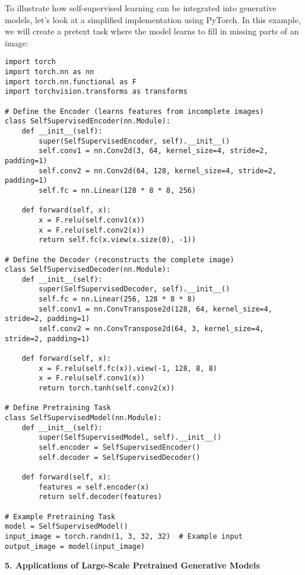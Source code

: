 To illustrate how self-supervised learning can be integrated into generative models, let's look at a simplified implementation using PyTorch. In this example, we will create a pretext task where the model learns to fill in missing parts of an image:

\begin{lstlisting}[style=python]
import torch
import torch.nn as nn
import torch.nn.functional as F
import torchvision.transforms as transforms

# Define the Encoder (learns features from incomplete images)
class SelfSupervisedEncoder(nn.Module):
    def __init__(self):
        super(SelfSupervisedEncoder, self).__init__()
        self.conv1 = nn.Conv2d(3, 64, kernel_size=4, stride=2, padding=1)
        self.conv2 = nn.Conv2d(64, 128, kernel_size=4, stride=2, padding=1)
        self.fc = nn.Linear(128 * 8 * 8, 256)
    
    def forward(self, x):
        x = F.relu(self.conv1(x))
        x = F.relu(self.conv2(x))
        return self.fc(x.view(x.size(0), -1))

# Define the Decoder (reconstructs the complete image)
class SelfSupervisedDecoder(nn.Module):
    def __init__(self):
        super(SelfSupervisedDecoder, self).__init__()
        self.fc = nn.Linear(256, 128 * 8 * 8)
        self.conv1 = nn.ConvTranspose2d(128, 64, kernel_size=4, stride=2, padding=1)
        self.conv2 = nn.ConvTranspose2d(64, 3, kernel_size=4, stride=2, padding=1)
    
    def forward(self, x):
        x = F.relu(self.fc(x)).view(-1, 128, 8, 8)
        x = F.relu(self.conv1(x))
        return torch.tanh(self.conv2(x))

# Define Pretraining Task
class SelfSupervisedModel(nn.Module):
    def __init__(self):
        super(SelfSupervisedModel, self).__init__()
        self.encoder = SelfSupervisedEncoder()
        self.decoder = SelfSupervisedDecoder()
    
    def forward(self, x):
        features = self.encoder(x)
        return self.decoder(features)

# Example Pretraining Task
model = SelfSupervisedModel()
input_image = torch.randn(1, 3, 32, 32)  # Example input
output_image = model(input_image)
\end{lstlisting}

\textbf{5. Applications of Large-Scale Pretrained Generative Models}

